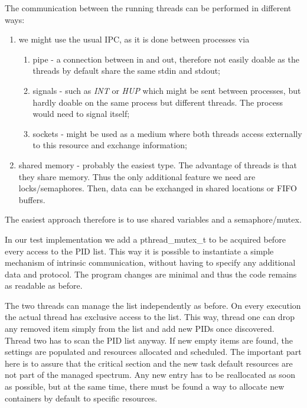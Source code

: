 \documentclass[]{scrartcl}
\begin{document}

The communication between the running threads can be performed in different ways:

\begin{enumerate}
	\item we might use the usual IPC, as it is done between processes via
	\begin{enumerate}
		\item pipe - a connection between in and out, therefore not easily doable as the threads by default share the same stdin and stdout;
		\item signals - such as \textit{INT} or \textit{HUP} which might be sent between processes, but hardly doable on the same process but different threads. The process would need to signal itself;
		\item sockets - might be used as a medium where both threads access externally to this resource and exchange information;
	\end{enumerate}
	\item shared memory - probably the easiest type. The advantage of threads is that they 
	share memory. Thus the only additional feature we need are locks/semaphores. Then, data can be exchanged in shared locations or FIFO buffers.
\end{enumerate}
The easiest approach therefore is to use shared variables and a semaphore/mutex.

In our test implementation we add a pthread\_mutex\_t to be acquired before every access to the PID list.
This way it is possible to instantiate a simple mechanism of intrinsic communication, without having to specify any additional data and protocol.
The program changes are minimal and thus the code remains as readable as before.

The two threads can manage the list independently as before. On every execution the actual thread has exclusive access to the list.
This way, thread one can drop any removed item simply from the list and add new PIDs once discovered. 
Thread two has to scan the PID list anyway.
If new empty items are found, the settings are populated and resources allocated and scheduled.
The important part here is to assure that the critical section and the new task default resources are not part of the managed spectrum.
Any new entry has to be reallocated as soon as possible, but at the same time, there must be found a way to allocate new containers by default to specific resources.
\end{document}
